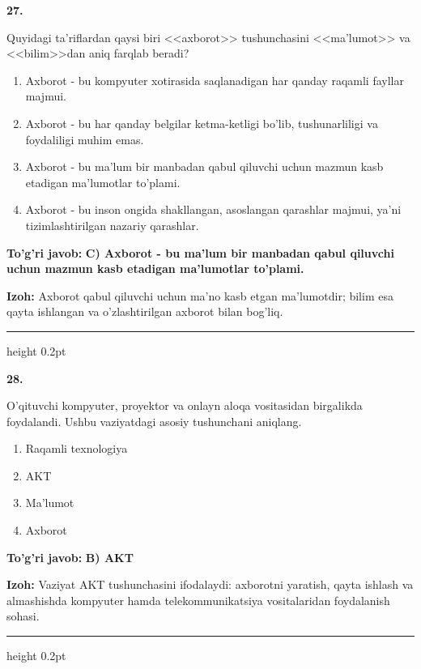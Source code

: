 \documentclass[10pt,a4paper,oneside]{article}
\begin{document}
\noindent\textbf{\color{ink}27.}
\par
Quyidagi ta'riflardan qaysi biri <<axborot>> tushunchasini <<ma'lumot>> va <<bilim>>dan aniq farqlab beradi?
\begin{enumerate}[label=\Alph*),leftmargin=9mm]
\item Axborot - bu kompyuter xotirasida saqlanadigan har qanday raqamli fayllar majmui.
\item Axborot - bu har qanday belgilar ketma-ketligi bo'lib, tushunarliligi va foydaliligi muhim emas.
\item Axborot - bu ma'lum bir manbadan qabul qiluvchi uchun mazmun kasb etadigan ma'lumotlar to'plami.
\item Axborot - bu inson ongida shakllangan, asoslangan qarashlar majmui, ya'ni tizimlashtirilgan nazariy qarashlar.
\end{enumerate}
\begin{tcolorbox}[enhanced,breakable,colback=teal!4,colframe=teal!50!black,boxrule=0.5pt,arc=1.1mm,left=3mm,right=3mm,top=1.7mm,bottom=1.7mm,before skip=2mm,after skip=2mm]
\textbf{\color{teal}To'g'ri javob:} \textbf{C) Axborot - bu ma'lum bir manbadan qabul qiluvchi uchun mazmun kasb etadigan ma'lumotlar to'plami.}
\par\smallskip
\textbf{Izoh:} Axborot qabul qiluvchi uchun ma'no kasb etgan ma'lumotdir; bilim esa qayta ishlangan va o'zlashtirilgan axborot bilan bog'liq.
\end{tcolorbox}
\vspace{2mm}\hrule height 0.2pt \vspace{3mm}

\noindent\textbf{\color{ink}28.}
\par
O'qituvchi kompyuter, proyektor va onlayn aloqa vositasidan birgalikda foydalandi. Ushbu vaziyatdagi asosiy tushunchani aniqlang.
\begin{enumerate}[label=\Alph*),leftmargin=9mm]
\item Raqamli texnologiya
\item AKT
\item Ma'lumot
\item Axborot
\end{enumerate}
\begin{tcolorbox}[enhanced,breakable,colback=teal!4,colframe=teal!50!black,boxrule=0.5pt,arc=1.1mm,left=3mm,right=3mm,top=1.7mm,bottom=1.7mm,before skip=2mm,after skip=2mm]
\textbf{\color{teal}To'g'ri javob:} \textbf{B) AKT}
\par\smallskip
\textbf{Izoh:} Vaziyat AKT tushunchasini ifodalaydi: axborotni yaratish, qayta ishlash va almashishda kompyuter hamda telekommunikatsiya vositalaridan foydalanish sohasi.
\end{tcolorbox}
\vspace{2mm}\hrule height 0.2pt \vspace{3mm}
\end{document}
